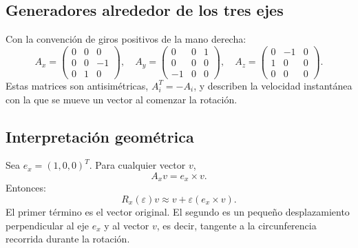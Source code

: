 \subsection{Generadores alrededor de los tres ejes}

Con la convención de giros positivos de la mano derecha:
\[
A_x=
\begin{pmatrix}
0&0&0\\
0&0&-1\\
0&1&0
\end{pmatrix},
\quad
A_y=
\begin{pmatrix}
0&0&1\\
0&0&0\\
-1&0&0
\end{pmatrix},
\quad
A_z=
\begin{pmatrix}
0&-1&0\\
1&0&0\\
0&0&0
\end{pmatrix}.
\]
Estas matrices son antisimétricas, \(A_i^T=-A_i\), y describen la velocidad instantánea
con la que se mueve un vector al comenzar la rotación.

\subsection{Interpretación geométrica}

Sea \(e_x=(1,0,0)^T\). Para cualquier vector \(v\),
\[
  A_xv=e_x\times v.
\]
Entonces:
\[
  R_x(\varepsilon)v\approx v+\varepsilon(e_x\times v).
\]
El primer término es el vector original. El segundo es un pequeño desplazamiento perpendicular
al eje \(e_x\) y al vector \(v\), es decir, tangente a la circunferencia recorrida durante
la rotación.

\begin{center}
\end{center}

